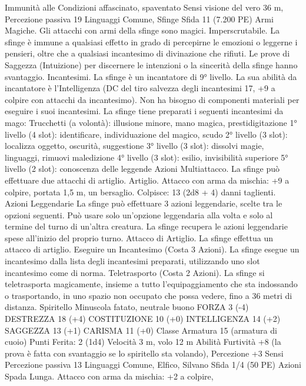 \begin{multicols}{2}
Immunità alle Condizioni affascinato, spaventato
Sensi visione del vero 36 m, Percezione passiva 19
Linguaggi Comune, Sfinge
Sfida 11 (7.200 PE)
Armi Magiche. Gli attacchi con armi della sfinge sono magici.
Imperscrutabile. La sfinge è immune a qualsiasi effetto in grado
di percepirne le emozioni o leggerne i pensieri, oltre che a
qualsiasi incantesimo di divinazione che rifiuti. Le prove di
Saggezza (Intuizione) per discernere le intenzioni o la sincerità
della sfinge hanno svantaggio.
Incantesimi. La sfinge è un incantatore di 9° livello. La sua
abilità da incantatore è l’Intelligenza (DC del tiro salvezza degli
incantesimi 17, +9 a colpire con attacchi da incantesimo). Non ha
bisogno di componenti materiali per eseguire i suoi incantesimi.
La sfinge tiene preparati i seguenti incantesimi da mago:
Trucchetti (a volontà): illusione minore, mano magica,
prestidigitazione
1° livello (4 slot): identificare, individuazione del magico, scudo
2° livello (3 slot): localizza oggetto, oscurità, suggestione
3° livello (3 slot): dissolvi magie, linguaggi, rimuovi maledizione
4° livello (3 slot): esilio, invisibilità superiore
5° livello (2 slot): conoscenza delle leggende
Azioni
Multiattacco. La sfinge può effettuare due attacchi di artiglio.
Artiglio. Attacco con arma da mischia: +9 a colpire, portata 1,5
m, un bersaglio.
Colpisce: 13 (2d8 + 4) danni taglienti.
Azioni Leggendarie
La sfinge può effettuare 3 azioni leggendarie, scelte tra le
opzioni seguenti. Può usare solo un’opzione leggendaria alla
volta e solo al termine del turno di un’altra creatura. La sfinge
recupera le azioni leggendarie spese all’inizio del proprio turno.
Attacco di Artiglio. La sfinge effettua un attacco di artiglio.
Eseguire un Incantesimo (Costa 3 Azioni). La sfinge esegue un
incantesimo dalla lista degli incantesimi preparati, utilizzando
uno slot incantesimo come di norma.
Teletrasporto (Costa 2 Azioni). La sfinge si teletrasporta
magicamente, insieme a tutto l’equipaggiamento che sta
indossando o trasportando, in uno spazio non occupato che possa
vedere, fino a 36 metri di distanza.
Spiritello
Minuscola fatato, neutrale buono
FORZA 3 (-4)
DESTREZZA 18 (+4)
COSTITUZIONE 10 (+0)
INTELLIGENZA 14 (+2)
SAGGEZZA 13 (+1)
CARISMA 11 (+0)
Classe Armatura 15 (armatura di cuoio)
\hspace*{0pt}\hfill{Punti Ferita}: 2 (1d4)
Velocità 3 m, volo 12 m
Abilità Furtività +8 (la prova è fatta con svantaggio se lo
spiritello sta volando), Percezione +3
Sensi Percezione passiva 13
Linguaggi Comune, Elfico, Silvano
Sfida 1/4 (50 PE)
Azioni
Spada Lunga. Attacco con arma da mischia: +2 a colpire,

\end{multicols}
